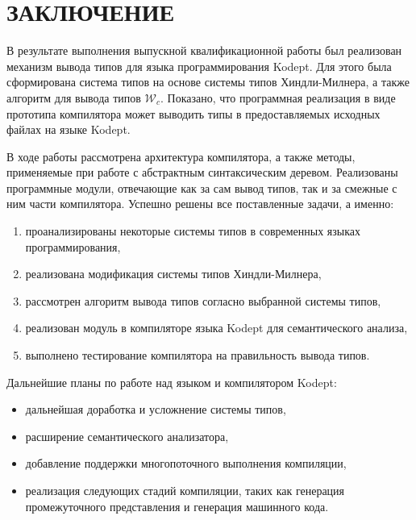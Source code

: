 \chapter*{ЗАКЛЮЧЕНИЕ}
\label{ch:conclusion}

В результате выполнения выпускной квалификационной работы был реализован механизм вывода типов для языка программирования Kodept.
Для этого была сформирована система типов на основе системы типов Хиндли-Милнера, а также алгоритм для вывода типов $\mathcal{W}_c$.
Показано, что программная реализация в виде прототипа компилятора может выводить типы в предоставляемых исходных файлах на языке Kodept.

В ходе работы рассмотрена архитектура компилятора, а также методы, применяемые при работе с абстрактным синтаксическим деревом.
Реализованы программные модули, отвечающие как за сам вывод типов, так и за смежные с ним части компилятора.
Успешно решены все поставленные задачи, а именно:
\begin{enumerate}[1)]
    \item проанализированы некоторые системы типов в современных языках программирования,
    \item реализована модификация системы типов Хиндли-Милнера,
    \item рассмотрен алгоритм вывода типов согласно выбранной системы типов,
    \item реализован модуль в компиляторе языка Kodept для семантического анализа,
    \item выполнено тестирование компилятора на правильность вывода типов.
\end{enumerate}

Дальнейшие планы по работе над языком и компилятором Kodept:
\begin{itemize}
    \item дальнейшая доработка и усложнение системы типов,
    \item расширение семантического анализатора,
    \item добавление поддержки многопоточного выполнения компиляции,
    \item реализация следующих стадий компиляции, таких как генерация промежуточного представления и генерация машинного кода.
\end{itemize}

